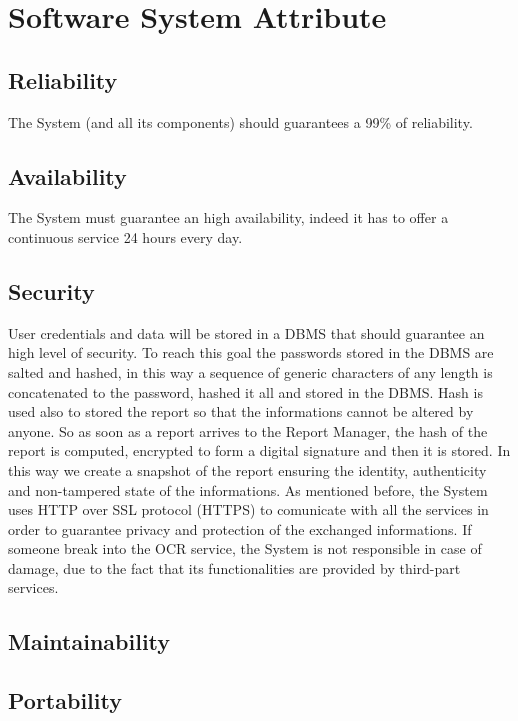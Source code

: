 \documentclass{report}
\begin{document}
\section{Software System Attribute}
\subsection{Reliability}
The System (and all its components) should guarantees a 99\% of reliability.
\subsection{Availability}
The System must guarantee an high availability, indeed it has to offer a continuous service 24 hours every day. 
\subsection{Security}
User credentials and data will be stored in a DBMS that should guarantee an high level of security. To reach this goal the passwords stored in the DBMS are salted and hashed, in this way a sequence of generic characters of any length is concatenated to the password, hashed it all and stored in the DBMS.
Hash is used also to stored the report so that the informations cannot be altered by anyone. So as soon as a report arrives to the Report Manager, the hash of the report is computed, encrypted to form a digital signature and then it is stored. In this way we create a snapshot of the report ensuring the identity, authenticity and non-tampered state of the informations.
As mentioned before, the System uses HTTP over SSL protocol (HTTPS) to comunicate with all the services in order to guarantee privacy and protection of the exchanged informations.
\newline
If someone break into the OCR service, the System is not responsible in case of damage, due to the fact that its functionalities are provided by third-part services.  
\subsection{Maintainability}
\subsection{Portability}
\end{document}
